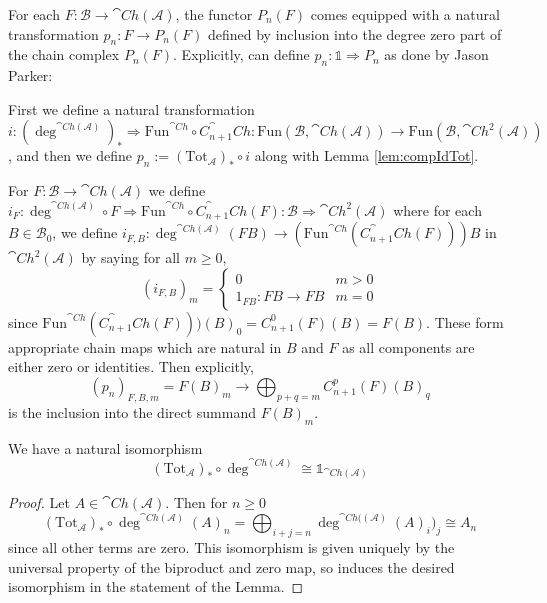 For each $F:\mathcal{B}\rightarrow \cat{Ch}(\mathcal{A})$, the functor $P_n(F)$ comes equipped with a natural transformation $p_n:F\rightarrow P_n(F)$ defined by inclusion into the degree zero part of the chain complex $P_n(F)$. Explicitly, can define $p_n:\mathbb{1}\Rightarrow P_n$ as done by Jason Parker:

\begin{rmk}[label=defn:littlepN]
    First we define a natural transformation $i:(\deg^{\cat{Ch}(\mathcal{A})})_*\Rightarrow \text{Fun}^{\cat{Ch}}\circ C_{n+1}^\cat{Ch}:\text{Fun}(\mathcal{B},\cat{Ch}(\mathcal{A}))\rightarrow \text{Fun}(\mathcal{B},\cat{Ch}^2(\mathcal{A}))$, and then we define $p_n := (\text{Tot}_\mathcal{A})_*\circ i$ along with Lemma \ref{lem:compIdTot}. 


    For $F:\mathcal{B}\rightarrow \cat{Ch}(\mathcal{A})$ we define $i_F:\deg^{\cat{Ch}(\mathcal{A})}\circ F\Rightarrow \text{Fun}^{\cat{Ch}}\circ C_{n+1}^\cat{Ch}(F):\mathcal{B}\Rightarrow \cat{Ch}^2(\mathcal{A})$ where for each $B \in \mathcal{B}_0$, we define $i_{F,B}:\deg^{\cat{Ch}(\mathcal{A})}(FB)\rightarrow (\text{Fun}^{\cat{Ch}}(C_{n+1}^\cat{Ch}(F)))B$ in $\cat{Ch}^2(\mathcal{A})$ by saying for all $m \geq 0$,
    \begin{equation*}
        (i_{F,B})_m = \left\{\begin{array}{cc} 0 & m > 0 \\
        1_{FB}:FB\rightarrow FB & m = 0 \end{array}\right.
    \end{equation*}
    since $\text{Fun}^{\cat{Ch}}(C_{n+1}^\cat{Ch}(F)))(B)_0 = C_{n+1}^0(F)(B) = F(B)$. These form appropriate chain maps which are natural in $B$ and $F$ as all components are either zero or identities. Then explicitly, 
    \begin{equation*}
        (p_n)_{F,B,m} = F(B)_m\to \bigoplus_{p+q=m}C_{n+1}^{p}(F)(B)_q
    \end{equation*}
    is the inclusion into the direct summand $F(B)_m$.
\end{rmk}


\begin{lem}[label=lem:compIdTot]
    We have a natural isomorphism
    \begin{equation*}
        (\text{Tot}_\mathcal{A})_*\circ \deg^{\cat{Ch}(\mathcal{A})} \cong \mathbb{1}_{\cat{Ch}(\mathcal{A})}
    \end{equation*}
\end{lem}
\begin{proof}
    Let $A \in \cat{Ch}(\mathcal{A})$. Then for $n \geq 0$
    \begin{equation*}
        (\text{Tot}_\mathcal{A})_*\circ \deg^{\cat{Ch}(\mathcal{A})}(A)_n = \bigoplus_{i+j=n}\deg^{\cat{Ch}((\mathcal{A})}(A)_i)_j \cong A_n
    \end{equation*}
    since all other terms are zero. This isomorphism is given uniquely by the universal property of the biproduct and zero map, so induces the desired isomorphism in the statement of the Lemma.
\end{proof}

